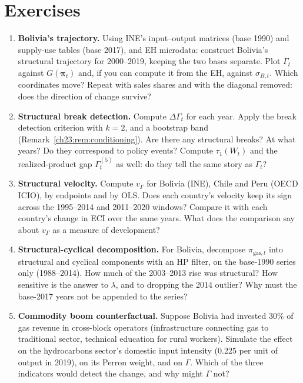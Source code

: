 \documentclass[../structural_economics_book.tex]{subfiles}
\begin{document}
\section{Exercises}
\label{ch23:sec:exercises}

\begin{enumerate}[label=\textbf{23.\arabic*}, leftmargin=3em]

\item \textbf{Bolivia's trajectory.} Using INE's input--output matrices (base 1990) and supply-use tables (base 2017), and EH microdata: construct Bolivia's structural trajectory for 2000--2019, keeping the two bases separate. Plot $\Gamma_t$ against $G(\boldsymbol{\pi}_t)$ and, if you can compute it from the EH, against $\sigma_{B,t}$. Which coordinates move? Repeat with sales shares and with the diagonal removed: does the direction of change survive?

\item \textbf{Structural break detection.} Compute $\Delta\Gamma_t$ for each year. Apply the break detection criterion with $k = 2$, and a bootstrap band (Remark~\ref{ch23:rem:conditioning}). Are there any structural breaks? At what years? Do they correspond to policy events? Compute $\tau_1(W_t)$ and the realized-product gap $\Gamma^{(5)}_t$ as well: do they tell the same story as $\Gamma_t$?

\item \textbf{Structural velocity.} Compute $v_\Gamma$ for Bolivia (INE), Chile and Peru (OECD ICIO), by endpoints and by OLS. Does each country's velocity keep its sign across the 1995--2014 and 2011--2020 windows? Compare it with each country's change in ECI over the same years. What does the comparison say about $v_\Gamma$ as a measure of development?

\item \textbf{Structural-cyclical decomposition.} For Bolivia, decompose $\pi_{\text{gas},t}$ into structural and cyclical components with an HP filter, on the base-1990 series only (1988--2014). How much of the 2003--2013 rise was structural? How sensitive is the answer to $\lambda$, and to dropping the 2014 outlier? Why must the base-2017 years not be appended to the series?

\item \textbf{Commodity boom counterfactual.} Suppose Bolivia had invested 30\% of gas revenue in cross-block operators (infrastructure connecting gas to traditional sector, technical education for rural workers). Simulate the effect on the hydrocarbons sector's domestic input intensity (0.225 per unit of output in 2019), on its Perron weight, and on $\Gamma$. Which of the three indicators would detect the change, and why might $\Gamma$ not?


\end{enumerate}
\end{document}

